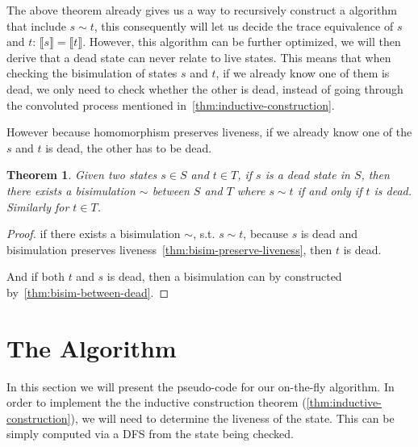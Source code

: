 \documentclass[conference]{IEEEtran}
\newtheorem{theorem}{Theorem}
\begin{document}
The above theorem already gives us a way to recursively construct a algorithm that include \(s ∼ t\), this consequently will let us decide the trace equivalence of \(s\) and \(t\): \(⟦s⟧ = ⟦t⟧\).
However, this algorithm can be further optimized, we will then derive that a dead state can never relate to live states. This means that when checking the bisimulation of states \(s\) and \(t\), if we already know one of them is dead, we only need to check whether the other is dead, instead of going through the convoluted process mentioned in~\cref{thm:inductive-construction}.

However because homomorphism preserves liveness, if we already know one of the \(s\) and \(t\) is dead, the other has to be dead.

\begin{theorem}\label{thm:bisim-one-dead}
    Given two states \(s ∈ S\) and \(t ∈ T\), if \(s\) is a dead state in \(S\), then there exists a bisimulation \(∼\) between \(S\) and \(T\) where \(s ∼ t\) if and only if \(t\) is dead. Similarly for \(t ∈ T\).
\end{theorem}

\begin{proof}
    if there exists a bisimulation \(∼\), s.t. \(s ∼ t\), because \(s\) is dead and bisimulation preserves liveness~\cref{thm:bisim-preserve-liveness}, then \(t\) is dead. 

    And if both \(t\) and \(s\) is dead, then a bisimulation can by constructed by~\cref{thm:bisim-between-dead}.
\end{proof}

\section{The Algorithm}

In this section we will present the pseudo-code for our on-the-fly algorithm. 
In order to implement the the inductive construction theorem (\cref{thm:inductive-construction}), we will need to determine the liveness of the state. This can be simply computed via a DFS from the state being checked. 
\end{document}
